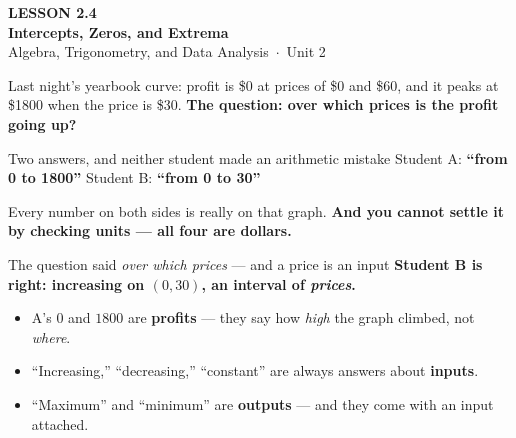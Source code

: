 \documentclass[aspectratio=169, 11pt]{beamer}
\begin{document}
{
\begin{frame}[plain]
  \vspace{2.8cm}\hspace{0.55cm}%
  \begin{minipage}{0.9\textwidth}
    {\color{goldacc}\bfseries\small LESSON 2.4}\\[0.5cm]
    {\color{white}\bfseries\LARGE Intercepts, Zeros, and Extrema}\\[1.2cm]
    {\color{mistmid}\small Algebra, Trigonometry, and Data Analysis~$\cdot$~Unit 2}
  \end{minipage}
\end{frame}
}

\begin{frame}[t, plain]
  Last night's yearbook curve: profit is \$0 at prices of \$0 and \$60, and it peaks at \$1800 when
  the price is \$30. \textbf{The question: over which prices is the profit going up?}
  \begin{block}{Two answers, and neither student made an arithmetic mistake}
    \centering\large
    Student A: \textbf{``from 0 to 1800''} \qquad\qquad Student B: \textbf{``from 0 to 30''}
  \end{block}
  \vspace{0.15cm}
  Every number on both sides is really on that graph. \textbf{And you cannot settle it by checking
  units --- all four are dollars.}
\end{frame}

\begin{frame}[t, plain]
  \begin{block}{The question said \emph{over which prices} --- and a price is an input}
    \centering\large
    \textbf{Student B is right: increasing on $(0,30)$, an interval of \emph{prices}.}
  \end{block}
  \begin{itemize}
    \setlength{\itemsep}{0.3cm}
    \item A's $0$ and $1800$ are \textbf{profits} --- they say how \emph{high} the graph climbed,
          not \emph{where}.
    \item ``Increasing,'' ``decreasing,'' ``constant'' are always answers about \textbf{inputs}.
    \item ``Maximum'' and ``minimum'' are \textbf{outputs} --- and they come with an input attached.
  \end{itemize}
\end{frame}
\end{document}
